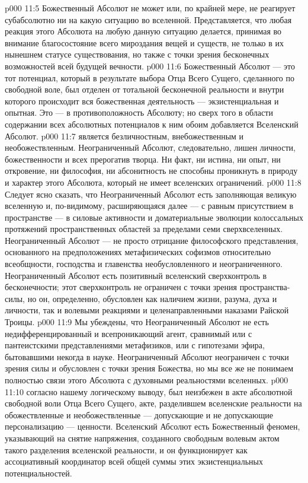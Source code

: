\vs p000 11:5 Божественный Абсолют не может или, по крайней мере, не реагирует субабсолютно ни на какую ситуацию во вселенной. Представляется, что любая реакция этого Абсолюта на любую данную ситуацию делается, принимая во внимание благосостояние всего мироздания вещей и существ, не только в их нынешнем статусе существования, но также с точки зрения бесконечных возможностей всей будущей вечности.
\vs p000 11:6 Божественный Абсолют --- это тот потенциал, который в результате выбора Отца Всего Сущего, сделанного по свободной воле, был отделен от тотальной бесконечной реальности и внутри которого происходит вся божественная деятельность --- экзистенциальная и опытная. Это ---  в противоположность  Абсолюту; но сверх того в области содержании всех абсолютных потенциалов к ним обоим добавляется Вселенский Абсолют.
\vs p000 11:7 \pc {}\bibnobreakspace {} является безличностным, внебожественным и необожествленным. Неограниченный Абсолют, следовательно, лишен личности, божественности и всех прерогатив творца. Ни факт, ни истина, ни опыт, ни откровение, ни философия, ни абсонитность не способны проникнуть в природу и характер этого Абсолюта, который не имеет вселенских ограничений.
\vs p000 11:8 Следует ясно сказать, что Неограниченный Абсолют есть  заполняющая великую вселенную и, по\hyp{}видимому, расширяющаяся далее --- с равным присутствием в пространстве --- в силовые активности и доматериальные эволюции колоссальных протяжений пространственных областей за пределами семи сверхвселенных. Неограниченный Абсолют --- не просто отрицание философского представления, основанного на предположениях метафизических софизмов относительно всеобщности, господства и главенства необусловленного и неограниченного. Неограниченный Абсолют есть позитивный вселенский сверхконтроль в бесконечности; этот сверхконтроль не ограничен с точки зрения пространства\hyp{}силы, но он, определенно, обусловлен как наличием жизни, разума, духа и личности, так и волевыми реакциями и целенаправленными наказами Райской Троицы.
\vs p000 11:9 Мы убеждены, что Неограниченный Абсолют не есть недифференцированный и всепроникающий агент, сравнимый или с пантеистскими представлениями метафизиков, или с гипотезами эфира, бытовавшими некогда в науке. Неограниченный Абсолют неограничен с точки зрения силы и обусловлен с точки зрения Божества, но мы все же не понимаем полностью связи этого Абсолюта с духовными реальностями вселенных.
\vs p000 11:10 \pc {}\bibnobreakspace {} согласно нашему логическому выводу, был неизбежен в акте абсолютной свободной воли Отца Всего Сущего, акте, разделившем вселенские реальности на обожествленные и необожествленные --- допускающие и не допускающие персонализацию --- ценности. Вселенский Абсолют есть Божественный феномен, указывающий на снятие напряжения, созданного свободным волевым актом такого разделения вселенской реальности, и он функционирует как ассоциативный координатор всей общей суммы этих экзистенциальных потенциальностей.
